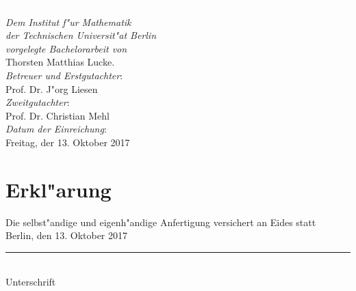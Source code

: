 \documentclass[11pt, twoside]{report}
\begin{document}


\thispagestyle{empty}
\textcolor{white}{bla} \\
\vfill
\textit{Dem Institut f"ur Mathematik\\
der Technischen Universit"at Berlin\\
vorgelegte Bachelorarbeit von} \\
Thorsten Matthias Lucke.\\

\textit{Betreuer und Erstgutachter}:\\
Prof. Dr. J"org Liesen\\

\emph{Zweitgutachter}:\\ Prof. Dr. Christian Mehl\\

\emph{Datum der Einreichung}:\\
Freitag, der 13. Oktober 2017


\chapter*{Erkl"arung}
Die selbst"andige und eigenh"andige Anfertigung versichert an Eides statt\\

Berlin, den 13. Oktober 2017\\

\rule{5cm}{1pt}\\
Unterschrift








\newpage

\chapter*{}
\end{document}
